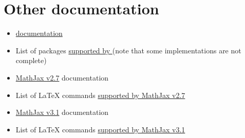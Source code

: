 \documentclass[a4paper]{article}
\theoremstyle{definition}
\begin{document}
\section{Other documentation}
\begin{itemize}
  \item \href{https://dlmf.nist.gov/LaTeXML/docs.html}{\LaTeXML{} documentation}
  \item List of packages \href{https://dlmf.nist.gov/LaTeXML/manual/included.bindings/}{supported by \LaTeXML{}} (note that some implementations are not complete)
  \item \href{http://docs.mathjax.org/en/v2.7-latest/}{MathJax v2.7} documentation
  \item List of \LaTeX{} commands \href{http://docs.mathjax.org/en/v2.7-latest/tex.html#supported-latex-commands}{supported by MathJax v2.7}
  \item \href{http://docs.mathjax.org/en/v3.1-latest/}{MathJax v3.1} documentation
  \item List of \LaTeX{} commands \href{http://docs.mathjax.org/en/v3.1-latest/input/tex/macros/index.html}{supported by MathJax v3.1}
\end{itemize}
\end{document}
